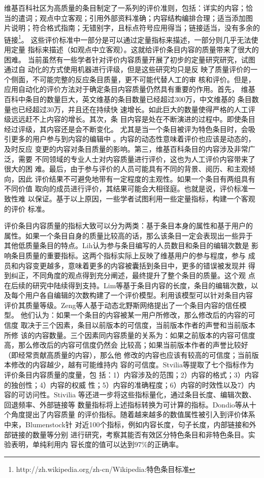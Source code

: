 维基百科社区为高质量的条目制定了一系列的评价准则，包括：详实的内容；恰
当的遣词；观点中立客观；引用外部资料准确；内容结构编排合理；适当添加图
片说明；符合格式指南；无错别字，且标点符号应用得当；链接适当，没有多余的链接\footnote{http://zh.wikipedia.org/zh-cn/Wikipedia:特色条目标准}。
这些评价标准中一部分是可以通过定量指标来描述，一部分则几乎无法使用定量
指标来描述（如观点中立客观）。这就给评价条目内容的质量带来了很大的困难。
当前虽然有一些学者针对评价内容质量开展了初步的定量研究研究，试图通过自
动化的方式使用机器进行评级，但是这些研究均只是反
映了质量评价的一个侧面，不可能完整的反应条目质量，更不可能代替人工的审
核和评价。但是，应用自动化的评价方法对于确定条目内容质量仍然具有重要的作用。首先，
维基百科中条目的数量巨大，英文维基的条目数量已经超过300万，中文维基的
条目数量也已经超过30万，并且还在持续快
速增长。如此巨大的数量使得严格的人工评级远远赶不上内容的增长。其次，条
目内容是处在不断演进的过程中。即使条目经过评级，其内容还是会不断变化。
尤其是当一个条目被评为特色条目时，会吸引更多的用户参与到内容的编辑中
\cite{thomas.woehner}。内容的动态性意味着评价也应该是动态的，及时反应
变更的内容对条目质量的影响。第三，维基百科条目的内容涉及非常广泛，需要
不同领域的专业人士对内容质量进行评价，这也为人工评价内容带来了很大的困
难。最后，由于参与评价的人员可能具有不同的背景、阅历、和主观倾向，因此
评价结果不可避免地带有一定程度的主观性。如果一个条目有两组具有不同价值
取向的成员进行评价，其结果可能会大相径庭。也就是说，评价标准一致性难
以保证。基于以上原因，一些学者试图利用一些定量指标，构建一个客观的评价
标准。

评价条目内容质量的指标大致可以分为两类：基于条目本身的属性和基于用户的
属性。如果一个条目自身的质量比较高的话，那么该条目一定会表现出一些异于
其他低质量条目的特点。Lih认为参与条目编写的人员数目和条目的编辑次数是
影响条目质量的重要指标。这两个指标实际上反映了维基用户的参与程度，参与
成员和内容变更越多，意味着更多的内容被囊括到条目中，更多的错误被发现并
得到纠正，不同角度的观点得到充分阐述，最终提升了整个条目的质量。这个观
点在后续的研究中陆续得到支持。Lim等基于条目内容的长度，条目的编辑次数，以
及每个用户各自编辑的次数构建了一个评价模型。利用该模型可以针对条目内容
评价其质量等级。Zeng等人基于动态北野斯网络提出了一个条目内容的信任模型。
他们认为：如果一个条目的内容被某一用户所修改，那么修改后的内容的可信度
取决于三个因素，条目以前版本的可信度，当前版本作者的声誉和当前版本所修
该的内容数量。三个因素同内容质量的关系为：如果之前版本的内容可信度高，那么修改后的内容可信度仍然会
比较高；如果当前版本作者的声誉比较好（即经常贡献高质量的内容），那么他
修改的内容也应该有较高的可信度；当前版本修改的内容越少，越有可能维持内
容的可信度。Stvilia等提取了七个指标作为评价条目内容质量的度量，包
括：1）内容涉及的范围；2）内容的格式；3）内容的独创性；4）内容的权威
性；5）内容的准确程度；6）内容的时效性以及7）内容的可访问性。Stivilia
等还进一步将这些指标量化，通过条目长度、编辑次数、回退频率、外部链接等
数量指标将上述指标转换为可计算的指标。Dondio等从十个角度提出了内容质量
的评价指标。随着越来越多的数值属性被引入到评价体系中来，Blumenstock针
对近100个指标，例如内容长度，句子长度，内部链接和外部链接的数量等分别
进行研究，考察其能否有效区分特色条目和非特色条目。实验表明，单纯利用内
容长度的值可以达到$97\%$的正确率。

